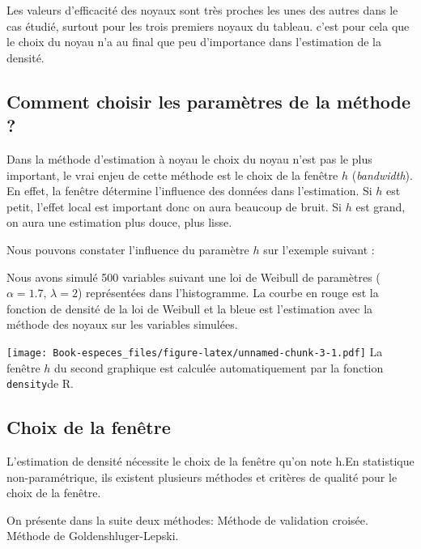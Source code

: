 \documentclass[
]{book}
\begin{document}
\begin{rem}
Les valeurs d'efficacité des noyaux sont très proches les unes des autres dans le cas étudié, surtout pour les trois premiers noyaux du tableau. c'est pour cela que le choix du noyau n'a au final que peu d'importance dans l'estimation de la densité. 
\end{rem}

\hypertarget{comment-choisir-les-paramuxe8tres-de-la-muxe9thode}{%
\subsection{Comment choisir les paramètres de la méthode ?}\label{comment-choisir-les-paramuxe8tres-de-la-muxe9thode}}

Dans la méthode d'estimation à noyau le choix du noyau n'est pas le plus important, le vrai enjeu de cette méthode est le choix de la fenêtre \(h\) (\emph{bandwidth}).
En effet, la fenêtre détermine l'influence des données dans l'estimation. Si \(h\) est petit, l'effet local est important donc on aura beaucoup de bruit. Si \(h\) est grand, on aura une estimation plus douce, plus lisse.

Nous pouvons constater l'influence du paramètre \(h\) sur l'exemple suivant :

Nous avons simulé 500 variables suivant une loi de Weibull de paramètres (\(\alpha = 1.7\), \(\lambda=2\)) représentées dans l'histogramme. La courbe en rouge est la fonction de densité de la loi de Weibull et la bleue est l'estimation avec la méthode des noyaux sur les variables simulées.

\texttt{[image: Book-especes\_files/figure-latex/unnamed-chunk-3-1.pdf]}
La fenêtre \(h\) du second graphique est calculée automatiquement par la fonction \texttt{density}de R.

\hypertarget{choix-de-la-fenuxeatre}{%
\subsection{Choix de la fenêtre}\label{choix-de-la-fenuxeatre}}

L'estimation de densité nécessite le choix de la fenêtre qu'on note h.\newline En statistique non-paramétrique, ils existent plusieurs méthodes et critères de qualité pour le choix de la fenêtre.\newline

On présente dans la suite deux méthodes:\newline
\hspace*{0.5cm} Méthode de validation croisée.\newline
\hspace*{0.5cm} Méthode de Goldenshluger-Lepski.\newline
\end{document}

